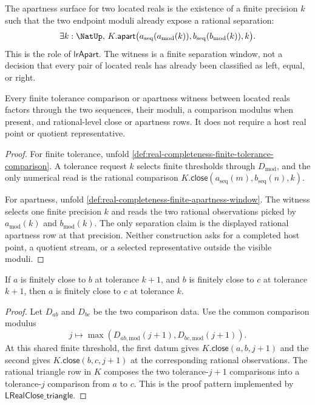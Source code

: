 \begin{definition}
\label{def:real-completeness-finite-apartness-window}
The apartness surface for two located reals is the existence of a finite
precision $k$ such that the two endpoint moduli already expose a rational
separation:
$$
\exists k:\NatUp,\,
K.\mathsf{apart}
\bigl(a_{\mathrm{seq}}(a_{\mathrm{mod}}(k)),
b_{\mathrm{seq}}(b_{\mathrm{mod}}(k)),k\bigr).
$$
This is the role of $\mathsf{lrApart}$.  The witness is a finite separation
window, not a decision that every pair of located reals has already been
classified as left, equal, or right.
\end{definition}

\begin{theorem}
\label{thm:real-completeness-finite-comparison-process-level}
Every finite tolerance comparison or apartness witness between located reals
factors through the two sequences, their moduli, a comparison modulus when
present, and rational-level close or apartness rows.  It does not require a
host real point or quotient representative.
\end{theorem}

\begin{proof}
For finite tolerance, unfold
\autoref{def:real-completeness-finite-tolerance-comparison}.  A tolerance
request $k$ selects finite thresholds through $D_{\mathrm{mod}}$, and the
only numerical read is the rational comparison
$K.\mathsf{close}(a_{\mathrm{seq}}(m),b_{\mathrm{seq}}(n),k)$.

For apartness, unfold
\autoref{def:real-completeness-finite-apartness-window}.  The witness
selects one finite precision $k$ and reads the two rational observations
picked by $a_{\mathrm{mod}}(k)$ and $b_{\mathrm{mod}}(k)$.  The only
separation claim is the displayed rational apartness row at that precision.
Neither construction asks for a completed host point, a quotient stream, or
a selected representative outside the visible moduli.
\end{proof}

\begin{theorem}
\label{thm:real-completeness-comparison-moduli-compose}
If $a$ is finitely close to $b$ at tolerance $k+1$, and $b$ is finitely
close to $c$ at tolerance $k+1$, then $a$ is finitely close to $c$ at
tolerance $k$.
\end{theorem}

\begin{proof}
Let $D_{ab}$ and $D_{bc}$ be the two comparison data.  Use the common
comparison modulus
$$
j\longmapsto
\max(D_{ab,\mathrm{mod}}(j+1),D_{bc,\mathrm{mod}}(j+1)).
$$
At this shared finite threshold, the first datum gives
$K.\mathsf{close}(a,b,j+1)$ and the second gives
$K.\mathsf{close}(b,c,j+1)$ at the corresponding rational observations.
The rational triangle row in $K$ composes the two tolerance-$j+1$ comparisons
into a tolerance-$j$ comparison from $a$ to $c$.  This is the proof pattern
implemented by $\mathsf{LRealClose\_triangle}$.
\end{proof}

